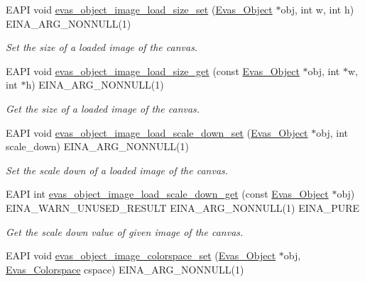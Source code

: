 \begin{DoxyCompactItemize}
EAPI void \hyperlink{group__Evas__Object__Image_ga1811fb73c1e138b5221cf4b25148111a}{evas\_\-object\_\-image\_\-load\_\-size\_\-set} (\hyperlink{group__Evas__Object__Group_ga9e19e6dd1f517a0ba437c0114d3e7c97}{Evas\_\-Object} $\ast$obj, int w, int h) EINA\_\-ARG\_\-NONNULL(1)
\begin{DoxyCompactList}\small\item\em Set the size of a loaded image of the canvas. \item\end{DoxyCompactList}\item 
EAPI void \hyperlink{group__Evas__Object__Image_gae8047183e894e1e1245f1f3aaf78f218}{evas\_\-object\_\-image\_\-load\_\-size\_\-get} (const \hyperlink{group__Evas__Object__Group_ga9e19e6dd1f517a0ba437c0114d3e7c97}{Evas\_\-Object} $\ast$obj, int $\ast$w, int $\ast$h) EINA\_\-ARG\_\-NONNULL(1)
\begin{DoxyCompactList}\small\item\em Get the size of a loaded image of the canvas. \item\end{DoxyCompactList}\item 
EAPI void \hyperlink{group__Evas__Object__Image_ga59796713b88c217ce5869cb003e404c0}{evas\_\-object\_\-image\_\-load\_\-scale\_\-down\_\-set} (\hyperlink{group__Evas__Object__Group_ga9e19e6dd1f517a0ba437c0114d3e7c97}{Evas\_\-Object} $\ast$obj, int scale\_\-down) EINA\_\-ARG\_\-NONNULL(1)
\begin{DoxyCompactList}\small\item\em Set the scale down of a loaded image of the canvas. \item\end{DoxyCompactList}\item 
EAPI int \hyperlink{group__Evas__Object__Image_ga259c48b3e2a4009e8a10f8e9874d3847}{evas\_\-object\_\-image\_\-load\_\-scale\_\-down\_\-get} (const \hyperlink{group__Evas__Object__Group_ga9e19e6dd1f517a0ba437c0114d3e7c97}{Evas\_\-Object} $\ast$obj) EINA\_\-WARN\_\-UNUSED\_\-RESULT EINA\_\-ARG\_\-NONNULL(1) EINA\_\-PURE
\begin{DoxyCompactList}\small\item\em Get the scale down value of given image of the canvas. \item\end{DoxyCompactList}\item 
EAPI void \hyperlink{group__Evas__Object__Image_gac352f7b110d7e527bf2d36fba5507d0c}{evas\_\-object\_\-image\_\-colorspace\_\-set} (\hyperlink{group__Evas__Object__Group_ga9e19e6dd1f517a0ba437c0114d3e7c97}{Evas\_\-Object} $\ast$obj, \hyperlink{group__Evas__Object__Image_ga8c6e60db9c8b83b155ccea52957ff656}{Evas\_\-Colorspace} cspace) EINA\_\-ARG\_\-NONNULL(1)

\end{DoxyCompactItemize}
